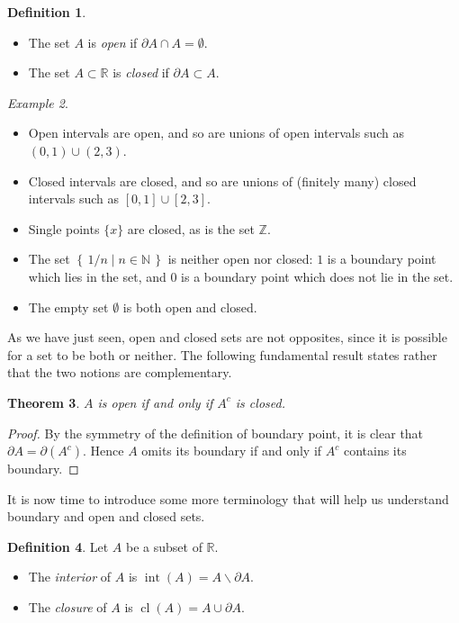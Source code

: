 \documentclass[11pt,oneside]{amsbook}
\newcommand{\set}[1]{\left\{\,#1\,\right\}}
\newcommand{\NN}{\mathbb N}
\newcommand{\ZZ}{\mathbb Z}
\newcommand{\RR}{\mathbb R}
\DeclareMathOperator{\cl}{cl}
\DeclareMathOperator{\inte}{int}
\renewcommand{\setminus}{\smallsetminus}
\theoremstyle{definition}
\theoremstyle{plain}
\newtheorem{thm}{Theorem}[section]
\theoremstyle{definition}
\newtheorem{defn}[thm]{Definition}
\theoremstyle{remark}
\newtheorem{example}[thm]{Example}
\numberwithin{equation}{section}
\numberwithin{figure}{section}
\begin{document}
\begin{defn}
  \begin{itemize}
    \item The set $A$ is \emph{open} if $\partial A\cap A=\emptyset$.
    \item The set $A\subset\RR$ is \emph{closed} if $\partial A\subset A$.
  \end{itemize}
\end{defn}

\begin{example}
  \begin{itemize}
  \item Open intervals are open, and so are unions of open intervals such as $(0,1)\cup(2,3)$.
  \item Closed intervals are closed, and so are unions of (finitely many) closed intervals such as $[0,1]\cup[2,3]$.
  \item Single points $\{x\}$ are closed, as is the set $\ZZ$.
  \item The set $\set{1/n\mid n\in\NN}$ is neither open nor closed: $1$ is a boundary point which lies in the set, and $0$ is a boundary point which does not lie in the set.
  \item The empty set $\emptyset$ is both open and closed.
  \end{itemize}
\end{example}

As we have just seen, open and closed sets are not opposites, since it is possible for a set to be both or neither. The following fundamental result states rather that the two notions are complementary.

\begin{thm}
  $A$ is open if and only if $A^c$ is closed.
\end{thm}

\begin{proof}
  By the symmetry of the definition of boundary point, it is clear that $\partial A=\partial(A^c)$. Hence $A$ omits its boundary if and only if $A^c$ contains its boundary.
\end{proof}

It is now time to introduce some more terminology that will help us understand boundary and open and closed sets.

\begin{defn}
  Let $A$ be a subset of $\RR$.
  \begin{itemize}
    \item The \emph{interior} of $A$ is $\inte(A)=A\setminus\partial A$.
    \item The \emph{closure} of $A$ is $\cl(A)=A\cup\partial A$.
  \end{itemize}
\end{defn}
\end{document}
